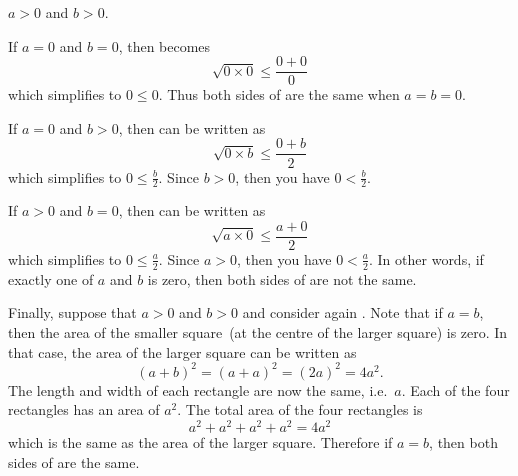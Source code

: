 \documentclass[a4paper,oneside,12pt]{article}
\begin{document}
\begin{problem}
{\begin{solution}
\begin{packedenumeral}
\item $a > 0$ and $b > 0$.
\end{packedenumeral}
If $a = 0$ and $b = 0$, then  becomes
\[
\sqrt{0 \times 0}
\leq
\frac{0 + 0}{0}
\]
which simplifies to $0 \leq 0$.  Thus both sides of
 are the same when $a = b = 0$.

If $a = 0$ and $b > 0$, then  can be
written as
\[
\sqrt{0 \times b}
\leq
\frac{0 + b}{2}
\]
which simplifies to $0 \leq \frac{b}{2}$.  Since $b > 0$, then you
have $0 < \frac{b}{2}$.

If $a > 0$ and $b = 0$, then  can be
written as
\[
\sqrt{a \times 0}
\leq
\frac{a + 0}{2}
\]
which simplifies to $0 \leq \frac{a}{2}$.  Since $a > 0$, then you
have $0 < \frac{a}{2}$.  In other words, if exactly one of $a$ and $b$
is zero, then both sides of  are not
the same.

Finally, suppose that $a > 0$ and $b > 0$ and consider again
.  Note that if
$a = b$, then the area of the smaller square~(at the centre of the
larger square) is zero.  In that case, the area of the larger square
can be written as
\[
(a + b)^2
=
(a + a)^2
=
(2a)^2
=
4a^2.
\]
The length and width of each rectangle are now the same, i.e.~$a$.
Each of the four rectangles has an area of $a^2$.  The total area of
the four rectangles is
\[
a^2 + a^2 + a^2 + a^2
=
4a^2
\]
which is the same as the area of the larger square.  Therefore if
$a = b$, then both sides of  are the
same.
\end{solution}
}{}
\end{problem}
\end{document}
